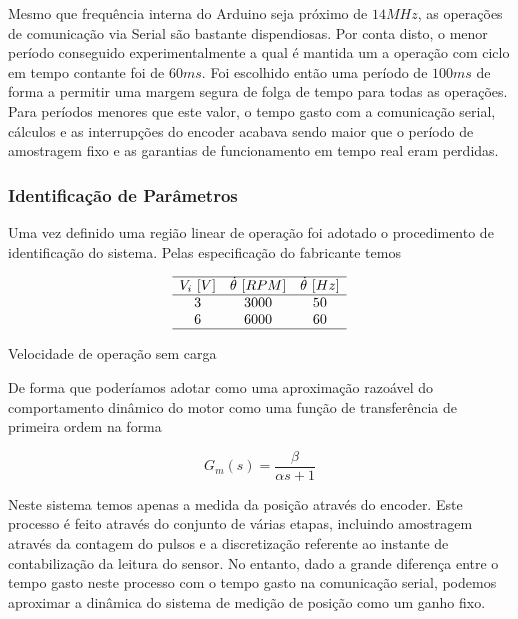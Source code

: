 \documentclass[a4paper,11pt]{article}
\begin{document}
Mesmo que frequência interna do Arduino seja próximo de $14 MHz$, as operações de comunicação via Serial são bastante dispendiosas. Por conta disto, o menor período conseguido experimentalmente a qual é mantida um a operação com ciclo em tempo contante foi de $60ms$. Foi escolhido então uma período de $100ms$ de forma a permitir uma margem segura de folga de tempo para todas as operações. Para períodos menores que este valor, o tempo gasto com a comunicação serial, cálculos e as interrupções do encoder acabava sendo maior que o período de amostragem fixo e as garantias de funcionamento em tempo real eram perdidas.


\subsubsection{Identificação de Parâmetros}

Uma vez definido uma região linear de operação foi adotado o procedimento de identificação do sistema. Pelas especificação do fabricante temos

\begin{table}[H]
    $$
    \begin{array}{ccc}
         \hline
         V_i\ [V] & \dot{\theta}\ [RPM] & \dot{\theta}\ [Hz]\\
         \hline
         3 & 3000 & 50 \\
         6 & 6000 & 60 \\
         \hline
    \end{array}
    $$
    \caption{Velocidade de operação sem carga}
    \label{tab:dcmotor_speed}
\end{table}

De forma que poderíamos adotar como uma aproximação razoável do comportamento dinâmico do motor como uma função de transferência de primeira ordem na forma

\begin{equation}
    G_m(s) = \frac{\beta}{\alpha s + 1}
\end{equation}

Neste sistema temos apenas a medida da posição através do encoder. Este processo é feito através do conjunto de várias etapas, incluindo amostragem através da contagem do pulsos e a discretização referente ao instante de contabilização da leitura do sensor. No entanto, dado a grande diferença entre o tempo gasto neste processo com o tempo gasto na comunicação serial, podemos aproximar a dinâmica do sistema de medição de posição como um ganho fixo.
\end{document}
